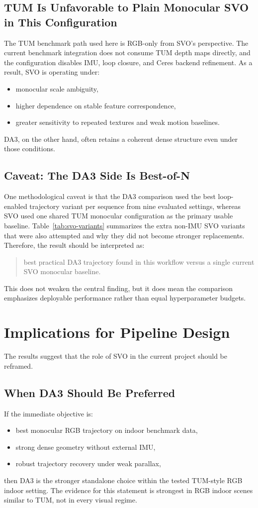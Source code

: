 \documentclass[conference]{IEEEtran}
\begin{document}
\subsection{TUM Is Unfavorable to Plain Monocular SVO in This Configuration}
The TUM benchmark path used here is RGB-only from SVO's perspective. The current benchmark integration does not consume TUM depth maps directly, and the configuration disables IMU, loop closure, and Ceres backend refinement. As a result, SVO is operating under:
\begin{itemize}
\item monocular scale ambiguity,
\item higher dependence on stable feature correspondence,
\item greater sensitivity to repeated textures and weak motion baselines.
\end{itemize}

DA3, on the other hand, often retains a coherent dense structure even under those conditions.

\subsection{Caveat: The DA3 Side Is Best-of-N}
One methodological caveat is that the DA3 comparison used the best loop-enabled trajectory variant per sequence from nine evaluated settings, whereas SVO used one shared TUM monocular configuration as the primary usable baseline. Table~\ref{tab:svo-variants} summarizes the extra non-IMU SVO variants that were also attempted and why they did not become stronger replacements. Therefore, the result should be interpreted as:

\begin{quote}
best practical DA3 trajectory found in this workflow versus a single current SVO monocular baseline.
\end{quote}

This does not weaken the central finding, but it does mean the comparison emphasizes deployable performance rather than equal hyperparameter budgets.

\section{Implications for Pipeline Design}
The results suggest that the role of SVO in the current project should be reframed.

\subsection{When DA3 Should Be Preferred}
If the immediate objective is:
\begin{itemize}
\item best monocular RGB trajectory on indoor benchmark data,
\item strong dense geometry without external IMU,
\item robust trajectory recovery under weak parallax,
\end{itemize}
then DA3 is the stronger standalone choice within the tested TUM-style RGB indoor setting. The evidence for this statement is strongest in RGB indoor scenes similar to TUM, not in every visual regime.
\end{document}
